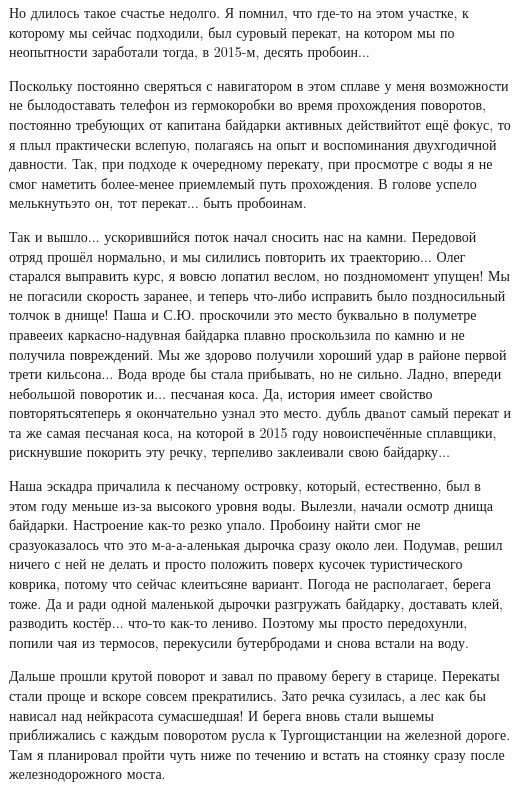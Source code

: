 Но длилось такое счастье недолго. Я помнил, что где-то на этом участке, к которому мы сейчас подходили, был суровый перекат, на котором мы по неопытности заработали тогда, в 2015-м, десять пробоин$\ldots$

Поскольку постоянно сверяться с навигатором в этом сплаве у меня возможности не было\mdash доставать телефон из гермокоробки во время прохождения поворотов, постоянно требующих от капитана байдарки активных действий\mdash тот ещё фокус, то я плыл практически вслепую, полагаясь на опыт и воспоминания двухгодичной давности. Так, при подходе к очередному перекату, при просмотре с воды я не смог наметить более-менее приемлемый путь прохождения. В голове успело мелькнуть\mdash это он, тот перекат$\ldots$ быть пробоинам.

Так и вышло$\ldots$ ускорившийся поток начал сносить нас на камни. Передовой отряд прошёл нормально, и мы силились повторить их траекторию$\ldots$ Олег старался выправить курс, я вовсю лопатил веслом, но поздно\mdash момент упущен! Мы не погасили скорость заранее, и теперь что-либо исправить было поздно\mdash сильный толчок в днище! Паша и С.Ю. проскочили это место буквально в полуметре правее\mdash их каркасно-надувная байдарка плавно проскользила по камню и не получила повреждений. Мы же здорово получили хороший удар в районе первой трети кильсона$\ldots$ Вода вроде бы стала прибывать, но не сильно. Ладно, впереди небольшой поворотик и$\ldots$ песчаная коса. Да, история имеет свойство повторяться\mdash теперь я окончательно узнал это место. дубль два\mdash nот самый перекат и та же самая песчаная коса, на которой в 2015 году новоиспечённые сплавщики, рискнувшие покорить эту речку, терпеливо заклеивали свою байдарку$\ldots$ 

Наша эскадра причалила к песчаному островку, который, естественно, был в этом году меньше из-за высокого уровня воды. Вылезли, начали осмотр днища байдарки. Настроение как-то резко упало. Пробоину найти смог не сразу\mdash оказалось что это м-а-а-аленькая дырочка сразу около леи. Подумав, решил ничего с ней не делать и просто положить поверх кусочек туристического коврика, потому что сейчас клеиться\mdash не вариант. Погода не располагает, берега тоже. Да и ради одной маленькой дырочки разгружать байдарку, доставать клей, разводить костёр$\ldots$ что-то как-то лениво. Поэтому мы просто передохунли, попили чая из термосов, перекусили бутербродами и снова встали на воду.

Дальше прошли крутой поворот и завал по правому берегу в старице. Перекаты стали проще и вскоре совсем прекратились. Зато речка сузилась, а лес как бы нависал над ней\mdash красота сумасшедшая! И берега вновь стали выше\mdash мы приближались с каждым поворотом русла к Тургощи\mdash станции на железной дороге. Там я планировал пройти чуть ниже по течению и встать на стоянку сразу после железнодорожного моста. 


